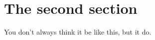 \documentclass[../../main.tex]{subfiles}
\begin{document}
\section{The second section}
You don't always think it be like this, but it do.
\end{document}
